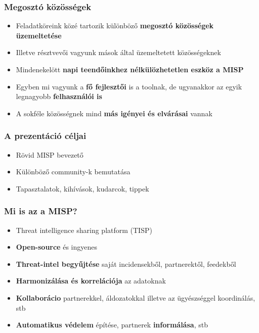 \begin{frame}
  \frametitle{Megosztó közösségek}
  \begin{itemize}
    \item Feladatköreink közé tartozik különböző {\bf megosztó közösségek üzemeltetése}
    \item Illetve résztvevői vagyunk mások által üzemeltetett közösségeknek
    \item Mindenekelött {\bf napi teendőinkhez nélkülözhetetlen eszköz a MISP}
    \item Egyben mi vagyunk a {\bf fő fejlesztői} is a toolnak, de ugyanakkor az egyik legnagyobb {\bf felhasználói is}
    \item A sokféle közösségnek mind {\bf más igényei és elvárásai} vannak
  \end{itemize}
\end{frame}

\begin{frame}
  \frametitle{A prezentáció céljai}
  \begin{itemize}
    \item Rövid MISP bevezető
    \item Különböző community-k bemutatása
    \item Tapasztalatok, kihívások, kudarcok, tippek
  \end{itemize}
\end{frame}

\begin{frame}
  \frametitle{Mi is az a MISP?}
  \begin{itemize}
     \item Threat intelligence sharing platform (TISP)
     \item {\bf Open-source} és ingyenes
     \item {\bf Threat-intel begyűjtése} saját incidensekből, partnerektől, feedekből
     \item {\bf Harmonizálása és korrelációja} az adatoknak
     \item {\bf Kollaborácio} partnerekkel, áldozatokkal illetve az ügyészséggel koordinálás, stb
     \item {\bf Automatikus védelem} építése, partnerek {\bf informálása}, stb
  \end{itemize}
\end{frame}


